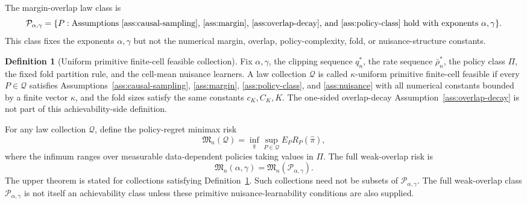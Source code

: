 \documentclass[11pt]{article}
\theoremstyle{definition}
\newtheorem{definition}{Definition}
\theoremstyle{plain}
\theoremstyle{remark}
\begin{document}
The margin-overlap law class is
\[
\mathcal P_{\alpha,\gamma}
=\{P:\text{Assumptions~\ref{ass:causal-sampling},
\ref{ass:margin}, \ref{ass:overlap-decay}, and
\ref{ass:policy-class} hold with exponents }\alpha,\gamma\}.
\]
This class fixes the exponents \(\alpha,\gamma\) but not the numerical
margin, overlap, policy-complexity, fold, or nuisance-structure constants.

\begin{definition}[Uniform primitive finite-cell feasible collection]\label{def:uniform-feasible-collection}
Fix \(\alpha,\gamma\), the clipping sequence \(q_n^*\), the rate sequence
\(\bar\rho_n^*\), the policy class \(\Pi\), the fixed fold partition rule,
and the cell-mean nuisance learners.  A law collection \(\mathcal Q\) is
called \(\kappa\)-uniform primitive finite-cell feasible if every
\(P\in\mathcal Q\) satisfies Assumptions~\ref{ass:causal-sampling},
\ref{ass:margin}, \ref{ass:policy-class}, and \ref{ass:nuisance} with all
numerical constants bounded by a finite vector \(\kappa\), and the fold sizes
satisfy the same constants \(c_K,C_K,K\).  The one-sided overlap-decay
Assumption~\ref{ass:overlap-decay} is not part of this achievability-side
definition.
\end{definition}

For any law collection \(\mathcal Q\), define the policy-regret minimax risk
\[
\mathfrak M_n(\mathcal Q)
=\inf_{\widehat\pi}
\sup_{P\in\mathcal Q}E_P R_P(\widehat\pi),
\]
where the infimum ranges over measurable data-dependent policies taking
values in \(\Pi\).  The full weak-overlap risk is
\[
\mathfrak M_n(\alpha,\gamma)=\mathfrak M_n(\mathcal P_{\alpha,\gamma}).
\]
The upper theorem is stated for collections satisfying
Definition~\ref{def:uniform-feasible-collection}.  Such collections need not
be subsets of \(\mathcal P_{\alpha,\gamma}\).  The full weak-overlap class
\(\mathcal P_{\alpha,\gamma}\) is not itself an achievability class unless
these primitive nuisance-learnability conditions are also supplied.
\end{document}

